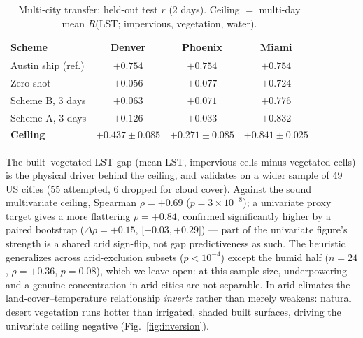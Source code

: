 \documentclass[conference]{IEEEtran}
\begin{document}
\begin{table}[ht]
  \centering
  \caption{Multi-city transfer: held-out test $r$ (2 days). Ceiling $=$ multi-day mean $R$(LST; impervious, vegetation, water).}
  \label{tab:transfer}
  \scriptsize
  \setlength{\tabcolsep}{3pt}
  \begin{tabular}{lccc}
    \toprule
    Scheme & Denver & Phoenix & Miami \\
    \midrule
    Austin ship (ref.) & $+0.754$ & $+0.754$ & $+0.754$ \\
    Zero-shot        & $+0.056$ & $+0.077$ & $+0.724$ \\
    Scheme B, 3 days & $+0.063$ & $+0.071$ & $+0.776$ \\
    Scheme A, 3 days & $+0.126$ & $+0.033$ & $+0.832$ \\
    \midrule
    \textbf{Ceiling} & $\mathbf{+0.437\pm0.085}$ & $\mathbf{+0.271\pm0.085}$ & $\mathbf{+0.841\pm0.025}$ \\
    \bottomrule
  \end{tabular}
\end{table}

The built--vegetated LST gap (mean LST, impervious cells minus vegetated
cells) is the physical driver behind the ceiling, and validates on a
wider sample of 49 US cities (55 attempted, 6 dropped for cloud cover).
Against the sound multivariate ceiling, Spearman $\rho{=}{+}0.69$
($p{=}3\times10^{-8}$); a univariate proxy target gives a more flattering
$\rho{=}{+}0.84$, confirmed significantly higher by a paired bootstrap
($\Delta\rho{=}{+}0.15$, [$+0.03,+0.29$]) --- part of the univariate
figure's strength is a shared arid sign-flip, not gap predictiveness as
such. The heuristic generalizes across arid-exclusion subsets
($p{<}10^{-4}$) except the humid half ($n{=}24$, $\rho{=}{+}0.36$,
$p{=}0.08$), which we leave open: at this sample size, underpowering and a
genuine concentration in arid cities are not separable. In arid climates
the land-cover--temperature relationship \emph{inverts} rather than merely
weakens: natural desert vegetation runs hotter than irrigated, shaded
built surfaces, driving the univariate ceiling negative (Fig.~\ref{fig:inversion}).
\end{document}
